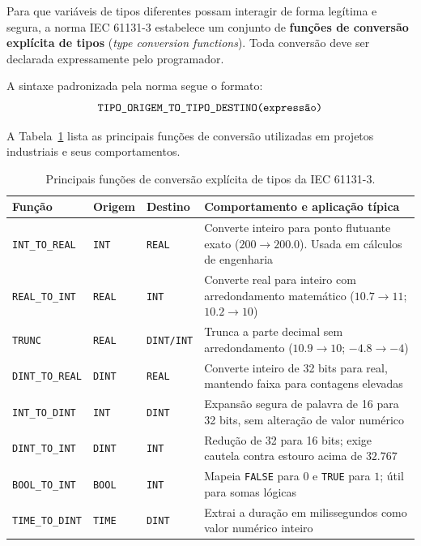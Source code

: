 Para que variáveis de tipos diferentes possam interagir de forma legítima e segura, a norma IEC
61131-3 estabelece um conjunto de \textbf{funções de conversão explícita de tipos} (\emph{type
conversion functions}). Toda conversão deve ser declarada expressamente pelo programador.

A sintaxe padronizada pela norma segue o formato:
\begin{equation}
  \text{\texttt{TIPO\_ORIGEM\_TO\_TIPO\_DESTINO(expressão)}}
  \label{eq:sintaxe-conversao}
\end{equation}

A Tabela~\ref{tab:conversoes-tipos} lista as principais funções de conversão utilizadas em
projetos industriais e seus comportamentos.

\begin{table}[H]
  \centering
  \caption{Principais funções de conversão explícita de tipos da IEC 61131-3.}
  \label{tab:conversoes-tipos}
  \begin{tabular}{p{3.2cm} p{2.0cm} p{2.0cm} p{6.6cm}}
    \toprule
    Função & Origem & Destino & Comportamento e aplicação típica \\
    \midrule
    \texttt{INT\_TO\_REAL}
      & \texttt{INT} & \texttt{REAL}
      & Converte inteiro para ponto flutuante exato ($200 \to 200.0$). Usada em cálculos de engenharia \\
    \texttt{REAL\_TO\_INT}
      & \texttt{REAL} & \texttt{INT}
      & Converte real para inteiro com arredondamento matemático ($10.7 \to 11$; $10.2 \to 10$) \\
    \texttt{TRUNC}
      & \texttt{REAL} & \texttt{DINT/INT}
      & Trunca a parte decimal sem arredondamento ($10.9 \to 10$; $-4.8 \to -4$) \\
    \texttt{DINT\_TO\_REAL}
      & \texttt{DINT} & \texttt{REAL}
      & Converte inteiro de 32 bits para real, mantendo faixa para contagens elevadas \\
    \texttt{INT\_TO\_DINT}
      & \texttt{INT} & \texttt{DINT}
      & Expansão segura de palavra de 16 para 32 bits, sem alteração de valor numérico \\
    \texttt{DINT\_TO\_INT}
      & \texttt{DINT} & \texttt{INT}
      & Redução de 32 para 16 bits; exige cautela contra estouro acima de $32.767$ \\
    \texttt{BOOL\_TO\_INT}
      & \texttt{BOOL} & \texttt{INT}
      & Mapeia \texttt{FALSE} para $0$ e \texttt{TRUE} para $1$; útil para somas lógicas \\
    \texttt{TIME\_TO\_DINT}
      & \texttt{TIME} & \texttt{DINT}
      & Extrai a duração em milissegundos como valor numérico inteiro \\
    \bottomrule
  \end{tabular}
\end{table}

